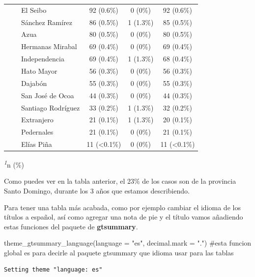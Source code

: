 \documentclass[
  letterpaper,
  DIV=11,
  numbers=noendperiod]{scrreprt}
\newenvironment{Shaded}{\begin{snugshade}}{\end{snugshade}}
\newcommand{\AttributeTok}[1]{\textcolor[rgb]{0.40,0.45,0.13}{#1}}
\newcommand{\CommentTok}[1]{\textcolor[rgb]{0.37,0.37,0.37}{#1}}
\newcommand{\FunctionTok}[1]{\textcolor[rgb]{0.28,0.35,0.67}{#1}}
\newcommand{\NormalTok}[1]{\textcolor[rgb]{0.00,0.23,0.31}{#1}}
\newcommand{\StringTok}[1]{\textcolor[rgb]{0.13,0.47,0.30}{#1}}
\begin{document}
\begin{table}
\begin{tabular*}{\linewidth}{@{\extracolsep{\fill}}lccc}
    El Seibo & 92 (0.6\%) & 0 (0\%) & 92 (0.6\%) \\ 
    Sánchez Ramírez & 86 (0.5\%) & 1 (1.3\%) & 85 (0.5\%) \\ 
    Azua & 80 (0.5\%) & 0 (0\%) & 80 (0.5\%) \\ 
    Hermanas Mirabal & 69 (0.4\%) & 0 (0\%) & 69 (0.4\%) \\ 
    Independencia & 69 (0.4\%) & 1 (1.3\%) & 68 (0.4\%) \\ 
    Hato Mayor & 56 (0.3\%) & 0 (0\%) & 56 (0.3\%) \\ 
    Dajabón & 55 (0.3\%) & 0 (0\%) & 55 (0.3\%) \\ 
    San José de Ocoa & 44 (0.3\%) & 0 (0\%) & 44 (0.3\%) \\ 
    Santiago Rodríguez & 33 (0.2\%) & 1 (1.3\%) & 32 (0.2\%) \\ 
    Extranjero & 21 (0.1\%) & 1 (1.3\%) & 20 (0.1\%) \\ 
    Pedernales & 21 (0.1\%) & 0 (0\%) & 21 (0.1\%) \\ 
    Elías Piña & 11 (<0.1\%) & 0 (0\%) & 11 (<0.1\%) \\ 
\bottomrule
\end{tabular*}
\begin{minipage}{\linewidth}
\textsuperscript{\textit{1}}n (\%)\\
\end{minipage}
\end{table}

Como puedes ver en la tabla anterior, el 23\% de los casos son de la
provincia Santo Domingo, durante los 3 años que estamos describiendo.

Para tener una tabla más acabada, como por ejemplo cambiar el idioma de
los títulos a español, así como agregar una nota de pie y el título
vamos añadiendo estas funciones del paquete de \textbf{gtsummary}.

\begin{Shaded}
\begin{Highlighting}[]
 \FunctionTok{theme\_gtsummary\_language}\NormalTok{(}\AttributeTok{language =} \StringTok{"es"}\NormalTok{, }\AttributeTok{decimal.mark =} \StringTok{"."}\NormalTok{) }\CommentTok{\#esta funcion global es para decirle al paquete gtsummary que idioma usar para las tablas}
\end{Highlighting}
\end{Shaded}

\begin{verbatim}
Setting theme "language: es"
\end{verbatim}
\end{document}
